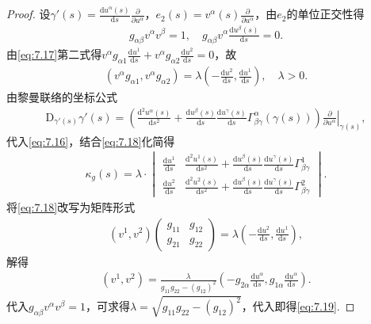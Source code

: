 \documentclass[../../main.tex]{subfiles}%
\begin{document}
\begin{proof}

设$\gamma'(s)=\frac{\mathrm{d}u^\alpha(s)}{\mathrm{d}s}\frac{\partial}{\partial u^\alpha}$，$e_2(s)=v^\alpha(s)\frac{\partial}{\partial u^\alpha}$，由$e_2$的单位正交性得
\begin{align}
g_{\alpha\beta}v^\alpha v^\beta=1,\quad g_{\alpha\beta}v^\alpha\frac{\mathrm{d}u^\beta(s)}{\mathrm{d}s}=0.\label{eq:7.17}
\end{align}
由\eqref{eq:7.17}第二式得$v^\alpha g_{\alpha1}\frac{\mathrm{d}u^1}{\mathrm{d}s}+v^\alpha g_{\alpha2}\frac{\mathrm{d}u^2}{\mathrm{d}s}=0$，故
\begin{align}
\left(v^\alpha g_{\alpha1},v^\alpha g_{\alpha2}\right)=\lambda\left(-\frac{\mathrm{d}u^2}{\mathrm{d}s},\frac{\mathrm{d}u^1}{\mathrm{d}s}\right),\quad \lambda>0.\label{eq:7.18}
\end{align}
由黎曼联络的坐标公式
\begin{align*}
\mathrm{D}_{\gamma'(s)}\gamma'(s)=\left(\frac{\mathrm{d}^2u^\alpha(s)}{\mathrm{d}s^2}+\frac{\mathrm{d}u^\beta(s)}{\mathrm{d}s}\frac{\mathrm{d}u^\gamma(s)}{\mathrm{d}s}\Gamma^\alpha_{\beta\gamma}(\gamma(s))\right)\left.\frac{\partial}{\partial u^\alpha}\right|_{\gamma(s)},
\end{align*}
代入\eqref{eq:7.16}，结合\eqref{eq:7.18}化简得
\begin{align*}
\kappa_g(s)=\lambda\cdot
\begin{vmatrix}
\frac{\mathrm{d}u^1}{\mathrm{d}s} & \frac{\mathrm{d}^2u^1(s)}{\mathrm{d}s^2}+\frac{\mathrm{d}u^\beta(s)}{\mathrm{d}s}\frac{\mathrm{d}u^\gamma(s)}{\mathrm{d}s}\Gamma^1_{\beta\gamma} \\
\frac{\mathrm{d}u^2}{\mathrm{d}s} & \frac{\mathrm{d}^2u^2(s)}{\mathrm{d}s^2}+\frac{\mathrm{d}u^\beta(s)}{\mathrm{d}s}\frac{\mathrm{d}u^\gamma(s)}{\mathrm{d}s}\Gamma^2_{\beta\gamma}
\end{vmatrix}.
\end{align*}
将\eqref{eq:7.18}改写为矩阵形式
\begin{align*}
\left(v^1,v^2\right)\begin{pmatrix}g_{11}&g_{12}\\g_{21}&g_{22}\end{pmatrix}=\lambda\left(-\frac{\mathrm{d}u^2}{\mathrm{d}s},\frac{\mathrm{d}u^1}{\mathrm{d}s}\right),
\end{align*}
解得
\begin{align*}
\left(v^1,v^2\right)=\frac{\lambda}{g_{11}g_{22}-(g_{12})^2}\left(-g_{2\alpha}\frac{\mathrm{d}u^\alpha}{\mathrm{d}s},g_{1\alpha}\frac{\mathrm{d}u^\alpha}{\mathrm{d}s}\right).
\end{align*}
代入$g_{\alpha\beta}v^\alpha v^\beta=1$，可求得$\lambda=\sqrt{g_{11}g_{22}-(g_{12})^2}$，代入即得\eqref{eq:7.19}.

\end{proof}
\end{document}
